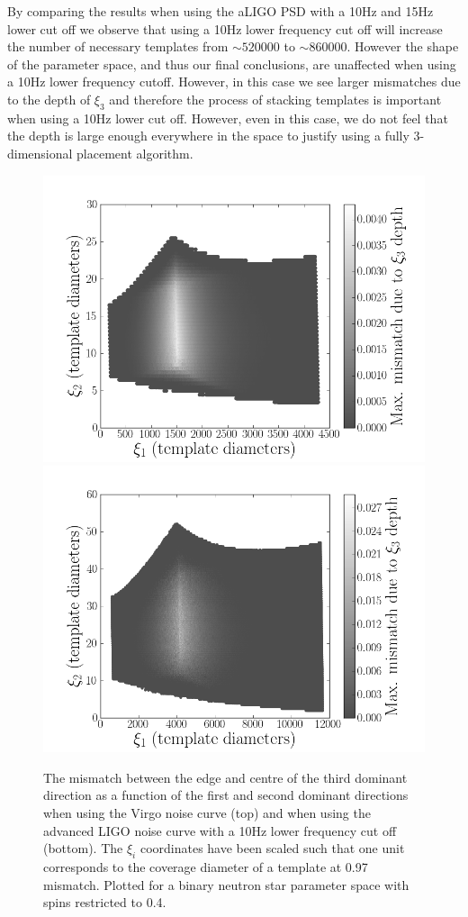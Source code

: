 By comparing the results when using the aLIGO PSD with a 10Hz and 15Hz lower cut off we observe
that using a 10Hz lower frequency cut off will increase the number of necessary templates from $\sim520000$
to $\sim860000$. However the
shape of the parameter space, and thus our final conclusions, are unaffected when using a 10Hz lower
frequency cutoff. However, in this case we see larger mismatches due to the depth of $\xi_3$ and
therefore the process of stacking templates is important when using a 10Hz lower cut off. However, even
in this case, we do
not feel that the depth is large enough everywhere in the space to justify using a fully 3-dimensional placement
algorithm.

\begin{figure}
\includegraphics[width=1.0\textwidth]{papers/bns_spin/figure7a.png}
\includegraphics[width=1.0\textwidth]{papers/bns_spin/figure7b.png}
\caption{\label{fig:param_space_mismatch_alt} The mismatch between the edge and centre of the
third dominant direction as a function of the first and second dominant
directions when using the Virgo noise curve (top) and when using the advanced LIGO noise curve
with a 10Hz lower frequency cut off (bottom). The $\xi_i$ coordinates have been scaled
such that one unit corresponds to the coverage diameter of a template
at 0.97 mismatch.
Plotted for a binary neutron star parameter space with spins restricted
to 0.4.}
\end{figure}

